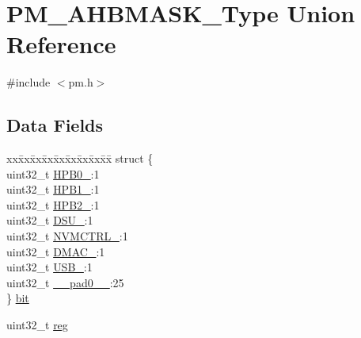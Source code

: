 \hypertarget{union_p_m___a_h_b_m_a_s_k___type}{}\section{P\+M\+\_\+\+A\+H\+B\+M\+A\+S\+K\+\_\+\+Type Union Reference}
\label{union_p_m___a_h_b_m_a_s_k___type}


{\ttfamily \#include $<$pm.\+h$>$}

\subsection*{Data Fields}
\begin{DoxyCompactItemize}
\item 
\begin{tabbing}
xx\=xx\=xx\=xx\=xx\=xx\=xx\=xx\=xx\=\kill
struct \{\\
\>uint32\_t \mbox{\hyperlink{union_p_m___a_h_b_m_a_s_k___type_ab7953569f906b8b07f42963855e519dc}{HPB0\_}}:1\\
\>uint32\_t \mbox{\hyperlink{union_p_m___a_h_b_m_a_s_k___type_a65c9248450d46a24abd35984c4e34850}{HPB1\_}}:1\\
\>uint32\_t \mbox{\hyperlink{union_p_m___a_h_b_m_a_s_k___type_af0d15072b1bd2ce25c815c84b4ebdcb8}{HPB2\_}}:1\\
\>uint32\_t \mbox{\hyperlink{union_p_m___a_h_b_m_a_s_k___type_a724689d6c4fa35b29f257a0c6f3ceb80}{DSU\_}}:1\\
\>uint32\_t \mbox{\hyperlink{union_p_m___a_h_b_m_a_s_k___type_a6de823b7e07b83ea17b7629575f4173f}{NVMCTRL\_}}:1\\
\>uint32\_t \mbox{\hyperlink{union_p_m___a_h_b_m_a_s_k___type_a470993eafd2b62b3b45d6ac402d4bb40}{DMAC\_}}:1\\
\>uint32\_t \mbox{\hyperlink{union_p_m___a_h_b_m_a_s_k___type_ae77ce6f59c35c88ea05ef92a25090acc}{USB\_}}:1\\
\>uint32\_t \mbox{\hyperlink{union_p_m___a_h_b_m_a_s_k___type_a3e57c2ef1c3ffb36722f000cc1156824}{\_\_pad0\_\_}}:25\\
\} \mbox{\hyperlink{union_p_m___a_h_b_m_a_s_k___type_a4afac199f11b7da3b722d724d6bee5c7}{bit}}\\

\end{tabbing}\item 
uint32\+\_\+t \mbox{\hyperlink{union_p_m___a_h_b_m_a_s_k___type_a6b91636401516a477989a336376d7b40}{reg}}
\end{DoxyCompactItemize}


